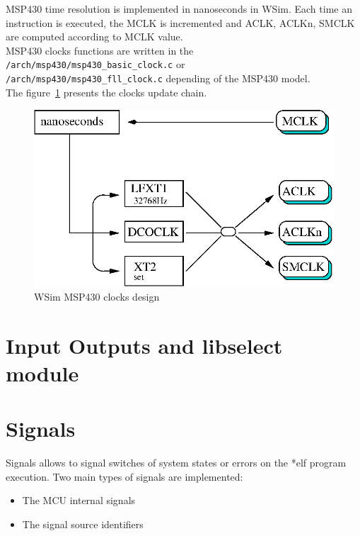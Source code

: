 \documentclass[a4paper,10pt]{report}
\begin{document}
MSP430 time resolution is implemented in nanoseconds in WSim. Each
time an instruction is executed, the MCLK is incremented and ACLK,
ACLKn, SMCLK are computed according to MCLK value.\\

MSP430 clocks functions are written in the
\verb$/arch/msp430/msp430_basic_clock.c$ or\\
\verb$/arch/msp430/msp430_fll_clock.c$ depending of the 
MSP430 model.\\

The figure~\ref{wsim-clocks} presents the clocks update chain.

\begin{figure}[!h]
\begin{center}
  \includegraphics[scale=0.9]{figures/wsim_clocks.eps}
\end{center}
\caption{WSim MSP430 clocks design}
\label{wsim-clocks}
\end{figure}


\section{Input Outputs and libselect module}


\section{Signals}
Signals allows to signal switches of system states or errors on the *elf program execution. Two main types of signals are implemented:
\begin{itemize}
  \item The MCU internal signals
  \item The signal source identifiers
\end{itemize}
\end{document}
